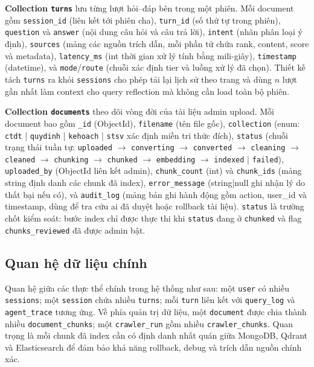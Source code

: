 \documentclass[../DoAn.tex]{subfiles}
\begin{document}
\textbf{Collection \texttt{turns}} lưu từng lượt hỏi--đáp bên trong một phiên.
Mỗi document gồm \texttt{session\_id} (liên kết tới phiên cha),
\texttt{turn\_id} (số thứ tự trong phiên), \texttt{question} và \texttt{answer}
(nội dung câu hỏi và câu trả lời), \texttt{intent} (nhãn phân loại ý định),
\texttt{sources} (mảng các nguồn trích dẫn, mỗi phần tử chứa rank, content,
score và metadata), \texttt{latency\_ms} (int thời gian xử lý tính bằng
mili-giây), \texttt{timestamp} (datetime), và \texttt{mode}/\texttt{route}
(chuỗi xác định tier và luồng xử lý đã chọn). Thiết kế tách \texttt{turns}
ra khỏi \texttt{sessions} cho phép tải lại lịch sử theo trang và dùng $n$ lượt
gần nhất làm context cho query reflection mà không cần load toàn bộ phiên.

\textbf{Collection \texttt{documents}} theo dõi vòng đời của tài liệu admin
upload. Mỗi document bao gồm \texttt{\_id} (ObjectId), \texttt{filename}
(tên file gốc), \texttt{collection} (enum: \texttt{ctdt} | \texttt{quydinh} |
\texttt{kehoach} | \texttt{stsv} xác định miền tri thức đích),
\texttt{status} (chuỗi trạng thái tuần tự: \texttt{uploaded} $\to$
\texttt{converting} $\to$ \texttt{converted} $\to$ \texttt{cleaning} $\to$
\texttt{cleaned} $\to$ \texttt{chunking} $\to$ \texttt{chunked} $\to$
\texttt{embedding} $\to$ \texttt{indexed} | \texttt{failed}),
\texttt{uploaded\_by} (ObjectId liên kết
admin), \texttt{chunk\_count} (int) và \texttt{chunk\_ids} (mảng string định
danh các chunk đã index), \texttt{error\_message} (string|null ghi nhận lý do
thất bại nếu có), và \texttt{audit\_log} (mảng bản ghi hành động gồm action,
user\_id và timestamp, dùng để tra cứu ai đã duyệt hoặc rollback tài liệu).
\texttt{status} là trường chốt kiểm soát: bước index chỉ được thực thi khi
\texttt{status} đang ở \texttt{chunked} và flag \texttt{chunks\_reviewed}
đã được admin bật.

\subsection{Quan hệ dữ liệu chính}

Quan hệ giữa các thực thể chính trong hệ thống như sau: một \texttt{user} có
nhiều \texttt{sessions}; một \texttt{session} chứa nhiều \texttt{turns}; mỗi
\texttt{turn} liên kết với \texttt{query\_log} và \texttt{agent\_trace} tương
ứng. Về phía quản trị dữ liệu, một \texttt{document} được chia thành nhiều
\texttt{document\_chunks}; một \texttt{crawler\_run} gồm nhiều
\texttt{crawler\_chunks}. Quan trọng là mỗi chunk đã index cần có định danh
nhất quán giữa MongoDB, Qdrant và Elasticsearch để đảm bảo khả năng rollback,
debug và trích dẫn nguồn chính xác.
\end{document}
